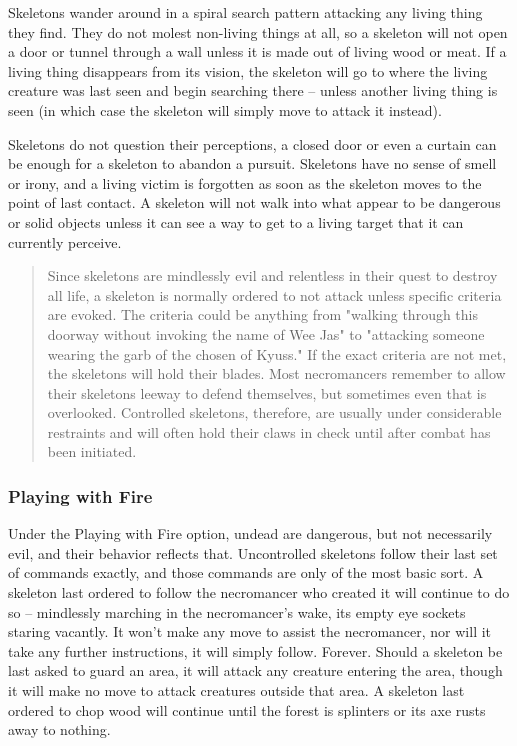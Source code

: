 Skeletons wander around in a spiral search pattern attacking any living thing they find. They do not molest non-living things at all, so a skeleton will not open a door or tunnel through a wall unless it is made out of living wood or meat. If a living thing disappears from its vision, the skeleton will go to where the living creature was last seen and begin searching there -- unless another living thing is seen (in which case the skeleton will simply move to attack it instead).

Skeletons do not question their perceptions, a closed door or even a curtain can be enough for a skeleton to abandon a pursuit. Skeletons have no sense of smell or irony, and a living victim is forgotten as soon as the skeleton moves to the point of last contact. A skeleton will not walk into what appear to be dangerous or solid objects unless it can see a way to get to a living target that it can currently perceive.

\begin{quote}

Since skeletons are mindlessly evil and relentless in their quest to destroy all life, a skeleton is normally ordered to not attack unless specific criteria are evoked. The criteria could be anything from "walking through this doorway without invoking the name of Wee Jas" to "attacking someone wearing the garb of the chosen of Kyuss." If the exact criteria are not met, the skeletons will hold their blades. Most necromancers remember to allow their skeletons leeway to defend themselves, but sometimes even that is overlooked. Controlled skeletons, therefore, are usually under considerable restraints and will often hold their claws in check until after combat has been initiated.
\end{quote}

\subsubsection{Playing with Fire}

Under the Playing with Fire option, undead are dangerous, but not necessarily evil, and their behavior reflects that. Uncontrolled skeletons follow their last set of commands exactly, and those commands are only of the most basic sort. A skeleton last ordered to follow the necromancer who created it will continue to do so -- mindlessly marching in the necromancer's wake, its empty eye sockets staring vacantly. It won't make any move to assist the necromancer, nor will it take any further instructions, it will simply follow. Forever. Should a skeleton be last asked to guard an area, it will attack any creature entering the area, though it will make no move to attack creatures outside that area. A skeleton last ordered to chop wood will continue until the forest is splinters or its axe rusts away to nothing.

